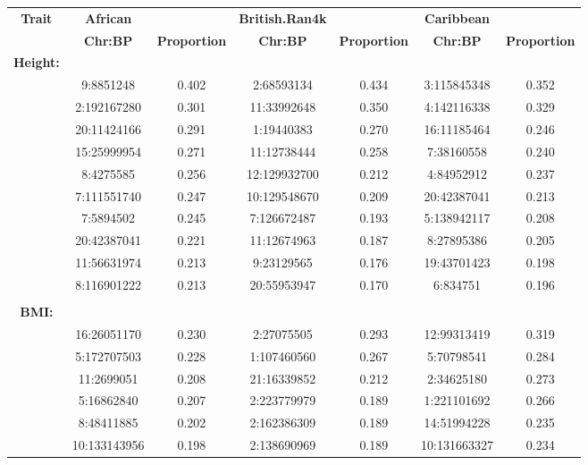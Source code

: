 \documentclass[12pt,a4paper]{article}
\begin{document}

\begin{landscape}
\setlength{\footskip}{2cm}
\begin{table}[ht]
\centering
\begin{tabular}{ccccccc}
  \hline
  \textbf{Trait} & \textbf{African} & & \textbf{British.Ran4k} & & \textbf{Caribbean} & \\ 
& \textbf{Chr:BP} & \textbf{Proportion} & \textbf{Chr:BP} & \textbf{Proportion} & \textbf{Chr:BP} & \textbf{Proportion} \\ 
  \hline
\textbf{Height:} & & & & & & \\
& 9:8851248 & 0.402 & 2:68593134 & 0.434 & 3:115845348 & 0.352 \\
  & 2:192167280 & 0.301 & 11:33992648 & 0.350 & 4:142116338 & 0.329 \\ 
  & 20:11424166 & 0.291 & 1:19440383 & 0.270 & 16:11185464 & 0.246 \\ 
  & 15:25999954 & 0.271 & 11:12738444 & 0.258 & 7:38160558 & 0.240 \\ 
  & 8:4275585 & 0.256 & 12:129932700 & 0.212 & 4:84952912 & 0.237 \\ 
  & 7:111551740 & 0.247 & 10:129548670 & 0.209 & 20:42387041 & 0.213 \\ 
  & 7:5894502 & 0.245 & 7:126672487 & 0.193 & 5:138942117 & 0.208 \\ 
  & 20:42387041 & 0.221 & 11:12674963 & 0.187 & 8:27895386 & 0.205 \\ 
  & 11:56631974 & 0.213 & 9:23129565 & 0.176 & 19:43701423 & 0.198 \\ 
  & 8:116901222 & 0.213 & 20:55953947 & 0.170 & 6:834751 & 0.196 \\ 
  \\
\textbf{BMI:} & & & & & & \\
& 16:26051170 & 0.230 & 2:27075505 & 0.293 & 12:99313419 & 0.319 \\ 
  & 5:172707503 & 0.228 & 1:107460560 & 0.267 & 5:70798541 & 0.284 \\ 
  & 11:2699051 & 0.208 & 21:16339852 & 0.212 & 2:34625180 & 0.273 \\ 
  & 5:16862840 & 0.207 & 2:223779979 & 0.189 & 1:221101692 & 0.266 \\ 
  & 8:48411885 & 0.202 & 2:162386309 & 0.189 & 14:51994228 & 0.235 \\ 
  & 10:133143956 & 0.198 & 2:138690969 & 0.189 & 10:131663327 & 0.234 \\ 

\end{tabular}
\end{table}
\end{landscape}
\end{document}
